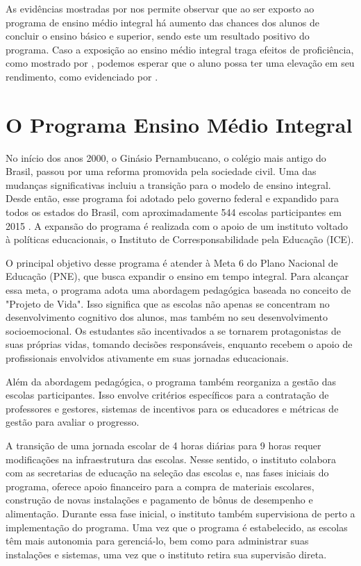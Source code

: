 As evidências mostradas por \cite{Dominguez_2020} nos permite observar que ao ser exposto ao programa de ensino médio integral há aumento das chances dos alunos de concluir o ensino básico e superior, sendo este um resultado positivo do programa. Caso a exposição ao ensino médio integral traga efeitos de proficiência, como mostrado por \cite{Barros_2019}, podemos esperar que o aluno possa ter uma elevação em seu rendimento, como evidenciado por \cite{Barros_2021}.
\chapter{O Programa Ensino Médio Integral} \label{programa}
No início dos anos 2000, o Ginásio Pernambucano, o colégio mais antigo do Brasil, passou por uma reforma promovida pela sociedade civil. Uma das mudanças significativas incluiu a transição para o modelo de ensino integral. Desde então, esse programa foi adotado pelo governo federal e expandido para todos os estados do Brasil, com aproximadamente 544 escolas participantes em 2015 \cite{Kawahara_2019}. A expansão do programa é realizada com o apoio de um instituto voltado à políticas educacionais, o Instituto de Corresponsabilidade pela Educação (ICE).

O principal objetivo desse programa é atender à Meta 6 do Plano Nacional de Educação (PNE), que busca expandir o ensino em tempo integral. Para alcançar essa meta, o programa adota uma abordagem pedagógica baseada no conceito de "Projeto de Vida". Isso significa que as escolas não apenas se concentram no desenvolvimento cognitivo dos alunos, mas também no seu desenvolvimento socioemocional. Os estudantes são incentivados a se tornarem protagonistas de suas próprias vidas, tomando decisões responsáveis, enquanto recebem o apoio de profissionais envolvidos ativamente em suas jornadas educacionais.

Além da abordagem pedagógica, o programa também reorganiza a gestão das escolas participantes. Isso envolve critérios específicos para a contratação de professores e gestores, sistemas de incentivos para os educadores e métricas de gestão para avaliar o progresso.

A transição de uma jornada escolar de 4 horas diárias para 9 horas requer modificações na infraestrutura das escolas. Nesse sentido, o instituto colabora com as secretarias de educação na seleção das escolas e, nas fases iniciais do programa, oferece apoio financeiro para a compra de materiais escolares, construção de novas instalações e pagamento de bônus de desempenho e alimentação. Durante essa fase inicial, o instituto também supervisiona de perto a implementação do programa. Uma vez que o programa é estabelecido, as escolas têm mais autonomia para gerenciá-lo, bem como para administrar suas instalações e sistemas, uma vez que o instituto retira sua supervisão direta.

